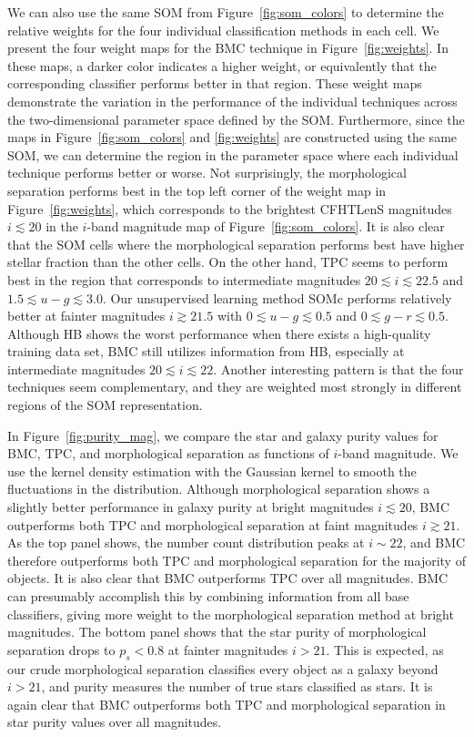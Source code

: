 We can also use the same SOM from Figure~\ref{fig:som_colors}
to determine the relative weights for 
the four individual classification methods in each cell.
We present the four weight maps for the BMC technique 
in Figure~\ref{fig:weights}.
In these maps, a darker color indicates a higher weight,
or equivalently that the corresponding classifier
performs better in that region.
These weight maps demonstrate the variation in
the performance of the individual techniques across
the two-dimensional parameter space defined by the SOM.
Furthermore, since the maps in Figure~\ref{fig:som_colors}
and \ref{fig:weights} are constructed using the same SOM,
we can determine the region in the parameter space
where each individual technique performs better or worse.
Not surprisingly, the morphological separation
performs best in the top left corner of the weight map
in Figure~\ref{fig:weights},
which corresponds to the brightest CFHTLenS magnitudes $i \lesssim 20$
in the $i$-band magnitude map of Figure~\ref{fig:som_colors}.
It is also clear that the SOM cells where the morphological
separation performs best have higher stellar fraction than
the other cells. 
On the other hand, TPC seems to perform best
in the region that corresponds to intermediate magnitudes
$20\lesssim i \lesssim 22.5$ and $1.5 \lesssim u-g \lesssim 3.0$.
Our unsupervised learning method SOMc
performs relatively better at fainter magnitudes $i \gtrsim 21.5$
with $0 \lesssim u-g \lesssim 0.5$ and $0 \lesssim g-r \lesssim 0.5$.
Although HB shows the worst performance
when there exists a high-quality training data set,
BMC still utilizes information from HB,
especially at intermediate magnitudes $20\lesssim i \lesssim 22$.
Another interesting pattern is that
the four techniques seem complementary,
and they are weighted most strongly in different regions
of the SOM representation.

In Figure~\ref{fig:purity_mag}, 
we compare the star and galaxy purity values
for BMC, TPC, and morphological separation
as functions of $i$-band magnitude.
We use the kernel density estimation \cite[KDE;][]{silverman1986density}
with the Gaussian kernel to smooth the fluctuations in the distribution.
Although morphological separation shows a slightly better performance
in galaxy purity at bright magnitudes $i \lesssim 20$,
BMC outperforms both TPC and morphological separation
at faint magnitudes $i \gtrsim 21$.
As the top panel shows,
the number count distribution peaks at $i \sim 22$,
and BMC therefore outperforms both TPC and morphological separation
for the majority of objects.
It is also clear that BMC outperforms TPC over all magnitudes.
BMC can presumably accomplish this by combining information from
all base classifiers,
\eg giving more weight to the morphological separation method
at bright magnitudes.
The bottom panel shows that
the star purity of morphological separation drops to $p_s < 0.8$
at fainter magnitudes $i > 21$.
This is expected, as our crude morphological separation classifies
every object as a galaxy beyond $i > 21$, and
purity measures the number of true stars classified as stars.
It is again clear that BMC outperforms both TPC and morphological separation
in star purity values over all magnitudes.

